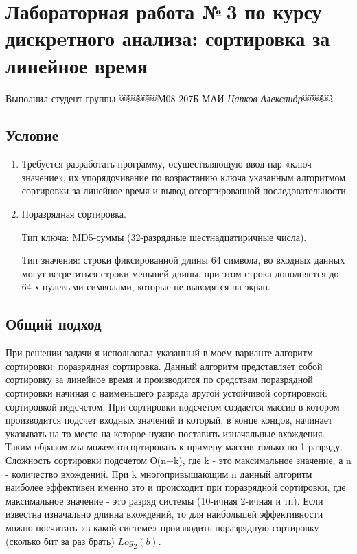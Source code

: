\documentclass[12pt]{article}
\begin{document}
\section*{Лабораторная работа №\,3 по курсу дискрeтного анализа: сортировка за линейное время}

Выполнил студент группы ￼￼￼￼М08-207Б МАИ \textit{Цапков Александр￼￼￼}.

\subsection*{Условие}

\begin{enumerate}
\item Требуется разработать программу, осуществляющую ввод пар «ключ-значение»,
 их упорядочивание по возрастанию ключа указанным алгоритмом сортировки за линейное
 время и вывод отсортированной последовательности.
\item Поразрядная сортировка.

Тип ключа: MD5-суммы (32-разрядные шестнадцатиричные числа).

Тип значения: строки фиксированной длины 64 символа, во входных данных могут встретиться строки меньшей длины, при этом строка дополняется до 64-х нулевыми символами, которые не выводятся на экран.

 
\end{enumerate}

\subsection*{Общий подход}

При решении задачи я использовал указанный в моем варианте алгоритм сортировки: поразрядная сортировка. Данный алгоритм представляет собой сортировку за линейное время и производится по средствам поразрядной сортировки начиная с наименьшего разряда другой устойчивой сортировкой: сортировкой подсчетом. При сортировки подсчетом создается массив в котором производится подсчет входных значений и который, в конце концов, начинает указывать на то место на которое нужно поставить изначальные вхождения. Таким образом мы можем отсортировать к примеру массив только по 1 разряду.  Сложность сортировки подсчетом О(n+k), где k -  это максимальное значение, а n - количество вхождений. При k многопривышающим n данный алгоритм наиболее эффективен именно это и происходит при поразрядной сортировки, где максимальное значение - это разряд системы (10-ичная 2-ичная и тп). Если известна изначально длинна вхождений, то для наибольшей эффективности можно посчитать «в какой системе» производить поразрядную сортировку (сколько бит за раз брать) $Log_2 (b)$.
\end{document}
